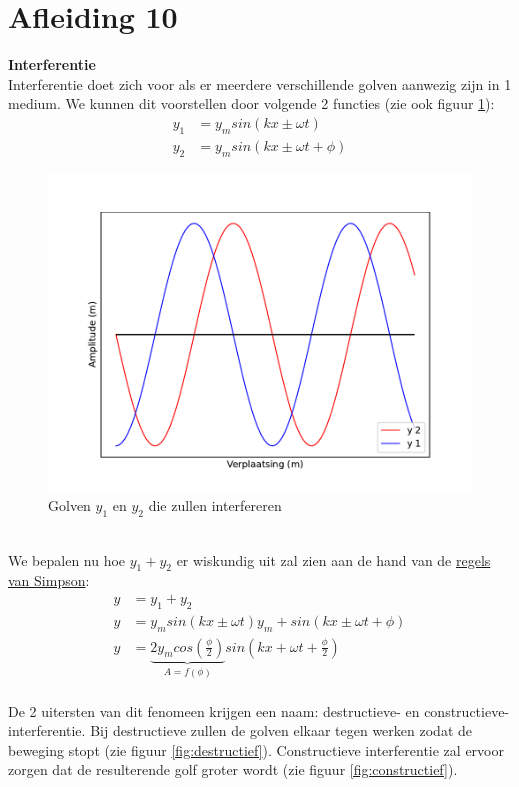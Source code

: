 \documentclass[a4paper,kul]{kulakarticle} %
\begin{document}
\section{Afleiding 10}
\textbf{Interferentie}\\
Interferentie doet zich voor als er meerdere verschillende golven aanwezig zijn in 1 medium. We kunnen dit voorstellen door volgende 2 functies (zie ook figuur \ref{fig:interferentie}):
\begin{align*}
	y_1 & = y_msin(kx\pm\omega t)\\
	y_2 & = y_msin(kx\pm\omega t +\phi)
\end{align*}
\begin{figure}[h]
	\centering
	\includegraphics[width=0.5\linewidth]{Interferentie}
	\caption[Interferentie]{Golven $y_1$ en $y_2$ die zullen interfereren}
	\label{fig:interferentie}
\end{figure}\\
We bepalen nu hoe $y_1+y_2$ er wiskundig uit zal zien aan de hand van de \href{https://nl.wikipedia.org/wiki/Lijst_van_goniometrische_gelijkheden#Som-naar-product-identiteiten_(regels_van_Simpson)}{regels van Simpson}:
\begin{align*}
	y & = y_1+y_2\\
	y & = y_msin(kx\pm\omega t) y_m+sin(kx\pm\omega t +\phi)\\
	y & = \underbrace{2y_mcos(\frac{\phi}{2})}_{A = f(\phi)}sin(kx+\omega t+\frac{\phi}{2})
\end{align*} \\
De 2 uitersten van dit fenomeen krijgen een naam: destructieve- en constructieve-interferentie. Bij destructieve zullen de golven elkaar tegen werken zodat de beweging stopt (zie figuur \ref{fig:destructief}). Constructieve interferentie zal ervoor zorgen dat de resulterende golf groter wordt (zie figuur \ref{fig:constructief}).
\end{document}
